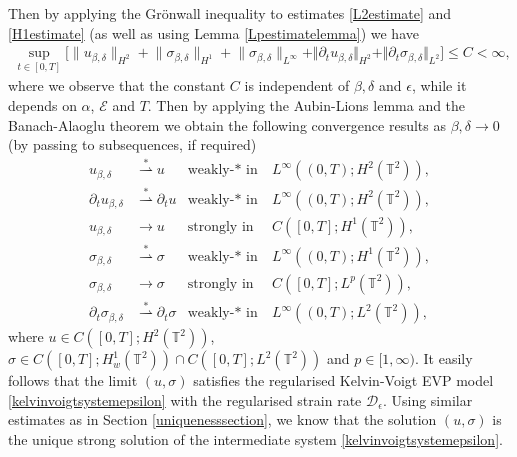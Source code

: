 \documentclass[12pt,a4paper]{article}
\theoremstyle{definition}
\theoremstyle{remark}
\numberwithin{equation}{section}
\begin{document}
Then by applying the Grönwall inequality to estimates \eqref{L2estimate} and \eqref{H1estimate} (as well as using Lemma \ref{Lpestimatelemma}) we have
\begin{align} \label{uniformestimate}
\sup_{t \in [0,T]} \biggl\lbrack \lVert u_{\beta,\delta} \rVert_{H^2} + \lVert \sigma_{\beta,\delta} \rVert_{H^1} + \lVert \sigma_{\beta,\delta} \rVert_{L^\infty} + \Vert \partial_t u_{\beta,\delta} \Vert_{H^2} + \Vert \partial_t\sigma_{\beta,\delta} \Vert_{L^2} \biggr\rbrack \leq C < \infty,
\end{align}
where we observe that the constant $C$ is independent of $\beta, \delta$ and $\epsilon$, while it depends on $\alpha$, $\mathcal{E}$ and $T$. Then by applying the Aubin-Lions lemma and the Banach-Alaoglu theorem we obtain the following convergence results as $\beta, \delta \rightarrow 0$ (by passing to subsequences, if required)
\begin{align}
    u_{\beta,\delta} & \overset{\ast}{\rightharpoonup} u &  \text{weakly-$* $ in}& ~ L^\infty ((0,T);H^2 (\mathbb{T}^2)), \\
    \partial_t u_{\beta,\delta} & \overset{\ast}{\rightharpoonup} \partial_t u &  \text{weakly-$* $ in}& ~ L^\infty ((0,T);H^2 (\mathbb{T}^2)),  \\
    u_{\beta,\delta} & \rightarrow u & \text{strongly in}& ~ C([0,T];H^1(\mathbb T^2)), \\
    \sigma_{\beta,\delta} &\overset{\ast}{\rightharpoonup} \sigma & \text{weakly-$* $ in}& ~ L^\infty ((0,T);H^1 (\mathbb{T}^2)), \\
    \sigma_{\beta,\delta} &\rightarrow \sigma & \text{strongly in}& ~ C([0,T];L^p(\mathbb T^2)),\\
    \partial_t \sigma_{\beta,\delta} & \overset{\ast}{\rightharpoonup} \partial_t \sigma & \text{weakly-$* $ in}& ~ L^\infty ((0,T); L^2 (\mathbb{T}^2)),
\end{align}
where $u \in C([0,T];H^2 (\mathbb{T}^2))$, $\sigma \in C([0,T];H^1_w (\mathbb{T}^2)) \cap C([0,T]; L^2 (\mathbb{T}^2))$ and $p \in [1,\infty)$. It easily follows that the limit $(u,\sigma)$ satisfies the regularised Kelvin-Voigt EVP model \eqref{kelvinvoigtsystemepsilon} with the regularised strain rate $\mathcal{D}_\epsilon$. Using similar estimates as in Section \ref{uniquenesssection}, we know that the solution $(u,\sigma)$ is the unique strong solution of the intermediate system \eqref{kelvinvoigtsystemepsilon}.
\end{document}
